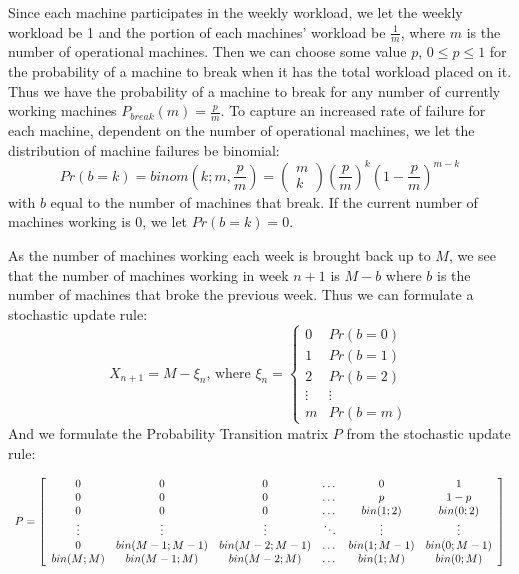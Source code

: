 \documentclass[12pt]{article}
\newcommand\scalemath[2]{\scalebox{#1}{\mbox{\ensuremath{\displaystyle #2}}}}
\numberwithin{equation}{section}
\begin{document}
\begin{enumerate}
\begin{enumerate}
            Since each machine participates in the weekly workload, we let the weekly workload be 1 and the portion of each machines' workload be $\frac{1}{m}$, where $m$ is the number of operational machines. Then we can choose some value $p$, $0\leq p\leq 1$ for the probability of a machine to break when it has the total workload placed on it. Thus we have the probability of a machine to break for any number of currently working machines $P_{break}(m)=\frac{p}{m}$. To capture an increased rate of failure for each machine, dependent on the number of operational machines, we let the distribution of machine failures be binomial:
            $$Pr(b=k)=binom(k;m,\frac{p}{m})=\left(\begin{array}{c}m\\k\end{array}\right)(\frac{p}{m})^k(1-\frac{p}{m})^{m-k}$$
            with $b$ equal to the number of machines that break. If the current number of machines working is 0, we let $Pr(b=k)=0$.

            As the number of machines working each week is brought back up to $M$, we see that the number of machines working in week $n+1$ is $M-b$ where $b$ is the number of machines that broke the previous week. Thus we can formulate a stochastic update rule:
            $$X_{n+1}=M-\xi_n\text{, where }\xi_n=\left\{\begin{array}{cc}0&Pr(b=0)\\1&Pr(b=1)\\2&Pr(b=2)\\ \vdots&\vdots\\m&Pr(b=m)\end{array}\right.$$
            And we formulate the Probability Transition matrix $P$ from the stochastic update rule:


            \[\scalemath{0.8}{P=\left[\begin{array}{cccccc}
            0&0&0&\dots&0&1\\
            0&0&0&\dots&p&1-p\\
            0&0&0&\dots&bin(1;2)&bin(0;2)\\
            \vdots&\vdots&\vdots&\ddots&\vdots&\vdots\\
            0&bin(M-1;M-1)&bin(M-2;M-1)&\dots&bin(1;M-1)&bin(0;M-1)\\
            bin(M;M)&bin(M-1;M)&bin(M-2;M)&\dots&bin(1;M)&bin(0;M)\\
            \end{array}\right]}\]


\end{enumerate}
\end{enumerate}
\end{document}
